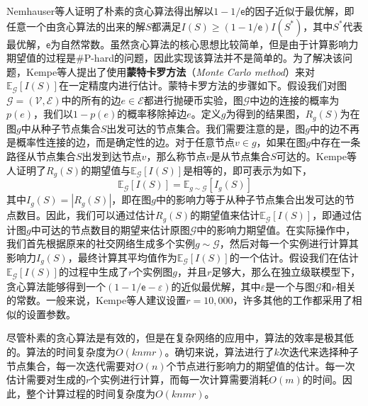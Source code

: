 Nemhauser等人证明了朴素的贪心算法得出解以$1-1/\mathsf{e}$的因子近似于最优解，即任意一个由贪心算法的出来的解$S$都满足$I\left(S\right) \geq (1-1/\mathsf{e}) I\left(S^{\ast}\right)$，其中$S^{\ast}$代表最优解，$\mathsf{e}$为自然常数。虽然贪心算法的核心思想比较简单，但是由于计算影响力期望值的过程是\#P-hard的问题，因此实现该算法并不是简单的。为了解决该问题，Kempe等人提出了使用\textbf{蒙特卡罗方法}（\textit{Monte Carlo method}）来对$\mathbb{E}_\mathcal{G}\left[I\left(S\right)\right]$在一定精度内进行估计。蒙特卡罗方法的步骤如下。假设我们对图$\mathcal{G}=\left(\mathcal{V},\mathcal{E}\right)$中的所有的边$e\in\mathcal{E}$都进行抛硬币实验，图$\mathcal{G}$中边的连接的概率为$p\left(e\right)$，我们以$1-p\left(e\right)$的概率移除掉边$e$。定义$g$为得到的结果图，$R_g\left(S\right)$为在图$g$中从种子节点集合$S$出发可达的节点集合。我们需要注意的是，图$g$中的边不再是概率性连接的边，而是确定性的边。对于任意节点$v\in g$，如果在图$g$中存在一条路径从节点集合$S$出发到达节点$v$，那么称节点$v$是从节点集合$S$可达的。Kempe等人证明了$R_g\left(S\right)$的期望值与$\mathbb{E}_\mathcal{G}\left[I\left(S\right)\right]$是相等的，即可表示为如下，
\begin{equation}\label{eq:influenceSpread}
    \mathbb{E}_\mathcal{G}\left[I\left(S\right)\right] = \mathbb{E}_{g\sim\mathcal{G}}\left[I_g\left(S\right)\right]
\end{equation}
其中$I_g\left(S\right) = \left\vert{R_g\left(S\right)}\right\vert$，即在图$g$中的影响力等于从种子节点集合出发可达的节点数目。因此，我们可以通过估计$R_g\left(S\right)$的期望值来估计$\mathbb{E}_\mathcal{G}\left[I\left(S\right)\right]$，即通过估计图$g$中可达的节点数目的期望来估计原图$\mathcal{G}$中的影响力期望值。在实际操作中，我们首先根据原来的社交网络生成多个实例$g\sim\mathcal{G}$，然后对每一个实例进行计算其影响力$I_g\left(S\right)$，最终计算其平均值作为$\mathbb{E}_\mathcal{G}\left[I\left(S\right)\right]$的一个估计。假设我们在估计$\mathbb{E}_\mathcal{G}\left[I\left(S\right)\right]$的过程中生成了$r$个实例图$g$，并且$r$足够大，那么在独立级联模型下，贪心算法能够得到一个$\left(1-1/\mathsf{e}-\varepsilon\right)$的近似最优解，其中$\varepsilon$是一个与图$\mathcal{G}$和$r$相关的常数。一般来说，Kempe等人建议设置$r=10,000$，许多其他的工作都采用了相似的设置参数。

尽管朴素的贪心算法是有效的，但是在复杂网络的应用中，算法的效率是极其低的。算法的时间复杂度为$O\left(knmr\right)$。确切来说，算法进行了$k$次迭代来选择种子节点集合，每一次迭代需要对$O\left(n\right)$个节点进行影响力的期望值的估计。每一次估计需要对生成的$r$个实例进行计算，而每一次计算需要消耗$O\left(m\right)$的时间。因此，整个计算过程的时间复杂度为$O\left(knmr\right)$。

